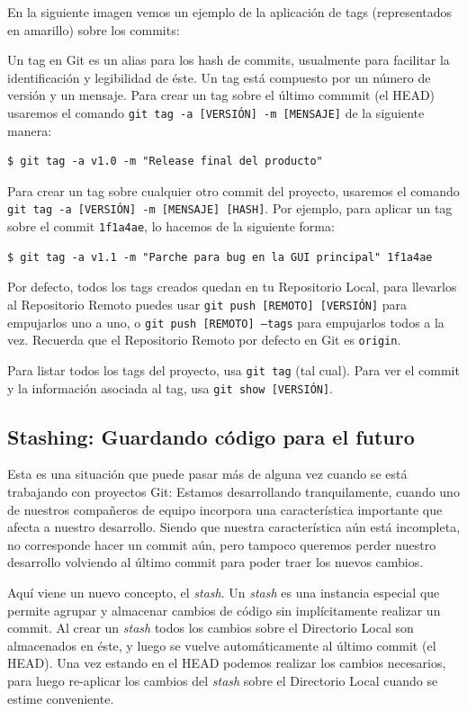 \documentclass{article}
\begin{document}
En la siguiente imagen vemos un ejemplo de la aplicación de tags (representados en amarillo) sobre los commits\cite{tag365}:

Un tag en Git es un alias para los hash de commits, usualmente para facilitar la identificación y legibilidad de éste. Un tag está compuesto por un número de versión y un mensaje. Para crear un tag sobre el último commmit (el HEAD) usaremos el comando \texttt{git tag -a [VERSIÓN] -m [MENSAJE]} de la siguiente manera:
\begin{verbatim}
$ git tag -a v1.0 -m "Release final del producto"
\end{verbatim}

Para crear un tag sobre cualquier otro commit del proyecto, usaremos el comando \texttt{git tag -a [VERSIÓN] -m [MENSAJE] [HASH]}. Por ejemplo, para aplicar un tag sobre el commit \texttt{1f1a4ae}, lo hacemos de la siguiente forma:
\begin{verbatim}
$ git tag -a v1.1 -m "Parche para bug en la GUI principal" 1f1a4ae
\end{verbatim}

Por defecto, todos los tags creados quedan en tu Repositorio Local, para llevarlos al Repositorio Remoto puedes usar \texttt{git push [REMOTO] [VERSIÓN]} para empujarlos uno a uno, o \texttt{git push [REMOTO] --tags} para empujarlos todos a la vez. Recuerda que el Repositorio Remoto por defecto en Git es \texttt{origin}.

Para listar todos los tags del proyecto, usa \texttt{git tag} (tal cual). Para ver el commit y la información asociada al tag, usa \texttt{git show [VERSIÓN]}.

\pagebreak

\subsection{Stashing: Guardando código para el futuro}\label{stash}

Esta es una situación que puede pasar más de alguna vez cuando se está trabajando con proyectos Git: Estamos desarrollando tranquilamente, cuando uno de nuestros compañeros de equipo incorpora una característica importante que afecta a nuestro desarrollo. Siendo que nuestra característica aún está incompleta, no corresponde hacer un commit aún, pero tampoco queremos perder nuestro desarrollo volviendo al último commit para poder traer los nuevos cambios.

Aquí viene un nuevo concepto, el \textit{stash}. Un \textit{stash} es una instancia especial que permite agrupar y almacenar cambios de código sin implícitamente realizar un commit. Al crear un \textit{stash} todos los cambios sobre el Directorio Local son almacenados en éste, y luego se vuelve automáticamente al último commit (el HEAD). Una vez estando en el HEAD podemos realizar los cambios necesarios, para luego re-aplicar los cambios del \textit{stash} sobre el Directorio Local cuando se estime conveniente.
\end{document}
